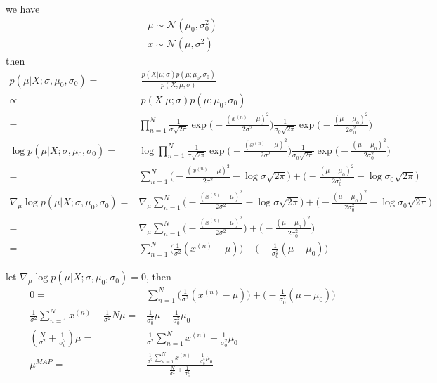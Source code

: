 \documentclass[../main.tex]{subfiles}
\begin{document}
we have
\begin{align*}
    \mu \sim \mathcal{N}(\mu_0, \sigma_0^2) \\
    x \sim \mathcal{N}(\mu, \sigma^2)
\end{align*}
then
\begin{align*}
    p(\mu | X; \sigma, \mu_0, \sigma_0)
    = & \ \frac{p(X|\mu; \sigma)
        p(\mu; \mu_0, \sigma_0)}
        {p(X; \mu, \sigma)} \\
    \propto & \ p(X|\mu; \sigma)
        p(\mu; \mu_0, \sigma_0) \\
    = & \prod^N_{n=1}
        \frac{1}{\sigma\sqrt{2\pi}}
        \exp\big( - \frac{(x^{(n)}-\mu)^2}
        {2 \sigma^2} \big)
        \frac{1}{\sigma_0 \sqrt{2\pi}}
        \exp\big( - \frac{(\mu - \mu_0)^2}
        {2 \sigma_0^2} \big) \\
    \log p(\mu | X; \sigma, \mu_0, \sigma_0)
    = & \log \prod^N_{n=1}
        \frac{1}{\sigma\sqrt{2\pi}}
        \exp\big( - \frac{(x^{(n)}-\mu)^2}
        {2 \sigma^2} \big)
        \frac{1}{\sigma_0 \sqrt{2\pi}}
        \exp\big( - \frac{(\mu - \mu_0)^2}
        {2 \sigma_0^2} \big) \\
    = & \sum^N_{n=1} \big(
        - \frac{(x^{(n)} - \mu)^2}{2 \sigma^2}
        - \log \sigma \sqrt{2 \pi}
        \big)
        + \big(
        - \frac{(\mu - \mu_0)^2}{2 \sigma_0^2}
        - \log \sigma_0 \sqrt{2\pi}
        \big) \\
    \nabla_\mu \log p(\mu | X; \sigma, \mu_0, \sigma_0)
    = & \nabla_\mu \sum^N_{n=1} \big(
        - \frac{(x^{(n)} - \mu)^2}{2 \sigma^2}
        - \log \sigma \sqrt{2 \pi}
        \big)
        + \big(
        - \frac{(\mu - \mu_0)^2}{2 \sigma_0^2}
        - \log \sigma_0 \sqrt{2\pi}
        \big) \\
    = & \nabla_\mu \sum^N_{n=1} \big(
        - \frac{(x^{(n)} - \mu)^2}{2 \sigma^2}
        \big)
        + \big(
        - \frac{(\mu - \mu_0)^2}{2 \sigma_0^2}
        \big) \\
    = & \sum^N_{n=1} \big(
        \frac{1}{\sigma^2}(x^{(n)} - \mu)
        \big)
        + \big(
        - \frac{1}{\sigma_0^2} (\mu - \mu_0)
        \big)
\end{align*}

let
$\nabla_\mu \log p(\mu | X; \sigma, \mu_0, \sigma_0) = 0$,
then
\begin{align*}
    0
    = & \sum^N_{n=1} \big(
    \frac{1}{\sigma^2}(x^{(n)} - \mu)
    \big)
    + \big(
    - \frac{1}{\sigma_0^2} (\mu - \mu_0)
    \big) \\
    \frac{1}{\sigma^2}\sum^N_{n=1}x^{(n)}
    - \frac{1}{\sigma^2} N \mu
    = & \frac{1}{\sigma_0^2} \mu
        - \frac{1}{\sigma_0^2} \mu_0 \\
    (\frac{N}{\sigma^2} + \frac{1}{\sigma_0^2})\mu
    = & \frac{1}{\sigma^2}\sum^N_{n=1}x^{(n)}
        + \frac{1}{\sigma_0^2} \mu_0 \\
    \mu^{MAP}
    = & \frac{\frac{1}{\sigma^2}\sum^N_{n=1}x^{(n)}
        + \frac{1}{\sigma_0^2} \mu_0}
        {\frac{N}{\sigma^2} + \frac{1}{\sigma_0^2}}
\end{align*}
\end{document}
